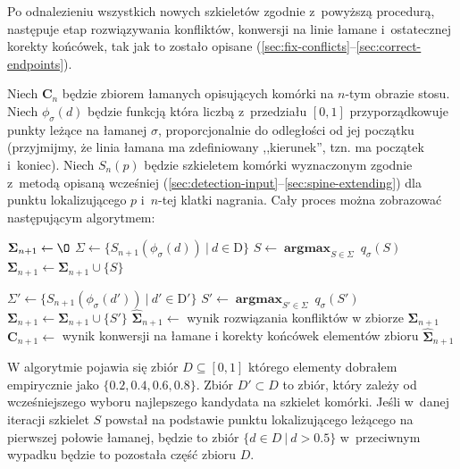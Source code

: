 \documentclass[declaration,shortabstract,mgr]{iithesis}
\DeclareMathOperator*{\argmax}{\textbf{argmax}}
\begin{document}
Po odnalezieniu wszystkich nowych szkieletów zgodnie z~powyższą procedurą, następuje etap rozwiązywania konfliktów, konwersji na linie łamane i~ostatecznej korekty końcówek, tak jak to zostało opisane (\ref{sec:fix-conflicts}--\ref{sec:correct-endpoints}).


Niech $\mathbf{C}_n$ będzie zbiorem łamanych opisujących komórki na $n$-tym obrazie stosu.
Niech $\phi_\sigma(d)$ będzie funkcją która liczbą z~przedziału $[0, 1]$ przyporządkowuje punkty leżące na łamanej $\sigma$, proporcjonalnie do odległości od jej początku (przyjmijmy, że linia łamana ma zdefiniowany ,,kierunek'', tzn. ma początek i~koniec). Niech $S_n(p)$ będzie szkieletem komórki wyznaczonym zgodnie z~metodą opisaną wcześniej (\ref{sec:detection-input}--\ref{sec:spine-extending}) dla punktu lokalizującego $p$ i~$n$-tej klatki nagrania.
Cały proces można zobrazować następującym algorytmem:

\par\medskip
\begin{algorithmic}

  \STATE $\mathbf{\Sigma}_{n+1} \gets \O$
    \STATE $\Sigma \gets \{ S_{n+1}(\phi_\sigma(d)) \ | \ d \in \text{D} \}$
    \STATE $S \gets \argmax_{S \in \Sigma} \ q_\sigma(S)$
    \STATE $\mathbf{\Sigma}_{n+1} \gets \mathbf{\Sigma}_{n+1} \cup \{ S \}$

      \STATE $\Sigma' \gets \{ S_{n+1}(\phi_\sigma(d')) \ | \ d' \in \text{D}' \}$
      \STATE $S' \gets \argmax_{S' \in \Sigma} \ q_\sigma(S')$
      \STATE $\mathbf{\Sigma}_{n+1} \gets \mathbf{\Sigma}_{n+1} \cup \{ S' \}$
    \ENDIF
  \ENDFOR
  \STATE $\mathbf{\hat{\Sigma}}_{n+1} \gets$ wynik rozwiązania konfliktów w zbiorze $\mathbf{\Sigma}_{n+1}$
  \STATE $\mathbf{C}_{n+1} \gets$ wynik konwersji na łamane i korekty końcówek elementów zbioru $\mathbf{\hat{\Sigma}}_{n+1}$
\ENDFOR

\end{algorithmic}

\noindent
W algorytmie pojawia się zbiór $D \subseteq [0, 1]$ którego elementy dobrałem empirycznie jako $\{ 0.2, 0.4, 0.6, 0.8 \}$.
Zbiór $D' \subset D$ to zbiór, który zależy od wcześniejszego wyboru najlepszego kandydata na szkielet komórki.
Jeśli w~danej iteracji szkielet $S$ powstał na podstawie punktu lokalizującego leżącego na pierwszej połowie łamanej, będzie to zbiór $\{ d \in D \ | \ d > 0.5 \}$ w~przeciwnym wypadku będzie to pozostała część zbioru $D$.
\end{document}
